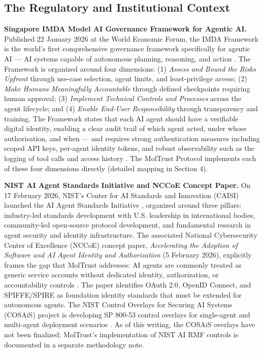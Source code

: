 \subsection{The Regulatory and Institutional Context}

\textbf{Singapore IMDA Model AI Governance Framework for Agentic AI.} Published 22 January 2026 at the World Economic Forum, the IMDA Framework is the world's first comprehensive governance framework specifically for agentic AI — AI systems capable of autonomous planning, reasoning, and action \cite{ref8_imda}. The Framework is organized around four dimensions: (1) \textit{Assess and Bound the Risks Upfront} through use-case selection, agent limits, and least-privilege access; (2) \textit{Make Humans Meaningfully Accountable} through defined checkpoints requiring human approval; (3) \textit{Implement Technical Controls and Processes} across the agent lifecycle; and (4) \textit{Enable End-User Responsibility} through transparency and training. The Framework states that each AI agent should have a verifiable digital identity, enabling a clear audit trail of which agent acted, under whose authorisation, and when — and requires strong authentication measures including scoped API keys, per-agent identity tokens, and robust observability such as the logging of tool calls and access history \cite{ref8_imda,ref21_imdafull}. The MolTrust Protocol implements each of these four dimensions directly (detailed mapping in Section 4).


\textbf{NIST AI Agent Standards Initiative and NCCoE Concept Paper.} On 17 February 2026, NIST's Center for AI Standards and Innovation (CAISI) launched the AI Agent Standards Initiative \cite{ref9_nistcaisi}, organized around three pillars: industry-led standards development with U.S. leadership in international bodies, community-led open-source protocol development, and fundamental research in agent security and identity infrastructure. The associated National Cybersecurity Center of Excellence (NCCoE) concept paper, \textit{Accelerating the Adoption of Software and AI Agent Identity and Authorization} (5 February 2026), explicitly frames the gap that MolTrust addresses: AI agents are commonly treated as generic service accounts without dedicated identity, authorization, or accountability controls \cite{ref10_nccoe}. The paper identifies OAuth 2.0, OpenID Connect, and SPIFFE/SPIRE as foundation identity standards that must be extended for autonomous agents. The NIST Control Overlays for Securing AI Systems (COSAiS) project is developing SP 800-53 control overlays for single-agent and multi-agent deployment scenarios \cite{ref22_cosais}. As of this writing, the COSAiS overlays have not been finalized; MolTrust's implementation of NIST AI RMF controls is documented in a separate methodology note.



